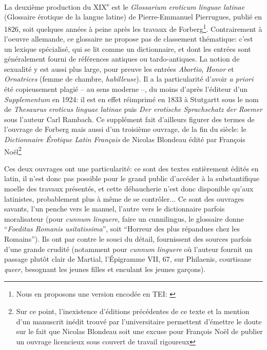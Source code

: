 La deuxième production du XIX\textsuperscript{e} est le \textit{Glossarium eroticum linguae latinae} (Glossaire érotique de la langue latine) de Pierre-Emmanuel Pierrugues, publié en 1826, soit quelques années à peine après les travaux de Forberg\footnote{Nous en proposons une version encodée en TEI: \textcite{Clerice_Lasciva_Roma_Lexical_2022}}. Contrairement à l'oeuvre allemande, ce glossaire ne propose pas de classement thématique: c'est un lexique spécialisé, qui se lit comme un dictionnaire, et dont les entrées sont généralement fourni de références antiques ou tardo-antiques. La notion de sexualité y est aussi plus large, pour preuve les entrées \textit{Abortio}, \textit{Honor} et \textit{Ornatrices} (femme de chambre, \textit{habilleuse}). Il a la particularité d'avoir \textit{a priori} été copieusement plagié -- au sens moderne --, du moins d'après l'éditeur d'un \textit{Supplementum} en 1924: il est en effet réimprimé en 1833 à Stutgartt sous le nom de \textit{Thesaurus eroticus linguae latinae} puis \textit{Der erotische Sprachschatz der Roemer} sous l'auteur Carl Rambach. Ce supplément fait d'ailleurs figurer des termes de l'ouvrage de Forberg mais aussi d'un troisième ouvrage, de la fin du siècle: le \textit{Dictionnaire Érotique Latin Français} de Nicolas Blondeau édité par François Noël\footnote{Sur ce point, l'inexistence d'éditions précédentes de ce texte et la mention d'un manuscrit inédit trouvé par l'universitaire permettent d'émettre le doute sur le fait que Nicolas Blondeau soit une excuse pour François Noël de publier un ouvrage licencieux sous couvert de travail rigoureux %
}

Ces deux ouvrages ont une particularité: ce sont des textes entièrement édités en latin, il n'est donc pas possible pour le grand public d'accéder à la substantifique moelle des travaux présentés, et cette débaucherie n'est donc disponible qu'aux latinistes, probablement plus à même de se contrôler... Ce sont des ouvrages savants, l'un penche vers le manuel, l'autre vers le dictionnaire parfois moralisateur (pour \textit{cunnum linguere}, faire un cunnilingus, le glossaire donne \enquote{\textit{Foeditas Romanis usitatissima}}, soit \enquote{Horreur des plus répandues chez les Romains}). Ils ont par contre le souci du détail, fournissent des sources parfois d'une grande crudité (notamment pour \textit{cunnum linguere} où l'auteur fournit un passage plutôt clair de Martial, l'Épigramme VII, 67, sur Philaenis, courtisane \textit{queer}, besognant les jeunes filles et enculant les jeunes garçons). 


